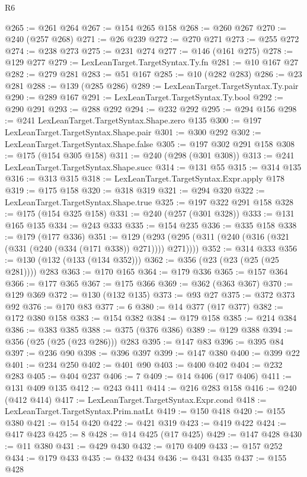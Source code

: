 \begin{lexlean}{R6}
\begin{coremodule}
{{{{{{{{{{{{{{{{{{{{{{{{{{{{{{{{{{{{{{{{{{{{{{{{{{{{{{{{{{{{{{{{{{{{{{{{@265 := @261 @264
@267 := @154 @265 @158
@268 := @260 @267
@270 := @240 (@257 @268)
@271 := @26 @239
@272 := @270 @271
@273 := @255 @272
@274 := @238 @273
@275 := @231 @274
@277 := @146 (@161 @275)
@278 := @129 @277
@279 := LexLeanTarget.TargetSyntax.Ty.fn
@281 := @10 @167 @27
@282 := @279 @281
@283 := @51 @167
@285 := @10 (@282 @283)
@286 := @23 @281
@288 := @139 (@285 @286)
@289 := LexLeanTarget.TargetSyntax.Ty.pair
@290 := @289 @167
@291 := LexLeanTarget.TargetSyntax.Ty.bool
@292 := @290 @291
@293 := @288 @292
@294 := @232 @292
@295 := @294 @156
@298 := @241 LexLeanTarget.TargetSyntax.Shape.zero @135
@300 := @197 LexLeanTarget.TargetSyntax.Shape.pair
@301 := @300 @292
@302 := LexLeanTarget.TargetSyntax.Shape.false
@305 := @197 @302 @291 @158
@308 := @175 (@154 @305 @158)
@311 := @240 (@298 (@301 @308))
@313 := @241 LexLeanTarget.TargetSyntax.Shape.succ
@314 := @131 @55
@315 := @314 @135
@316 := @313 @315
@318 := LexLeanTarget.TargetSyntax.Expr.apply @178
@319 := @175 @158
@320 := @318 @319
@321 := @294 @320
@322 := LexLeanTarget.TargetSyntax.Shape.true
@325 := @197 @322 @291 @158
@328 := @175 (@154 @325 @158)
@331 := @240 (@257 (@301 @328))
@333 := @131 @165 @135
@334 := @243 @333
@335 := @154 @235
@336 := @335 @158
@338 := @179 (@177 @336)
@351 := @129 (@293 (@295 (@311 (@240 (@316 (@321 (@331 (@240 (@334 (@171 @338)) @271)))) @271))))
@352 := @314 @333
@356 := @130 (@132 (@133 (@134 @352)))
@362 := @356 (@23 (@23 (@25 (@25 @281)))) @283
@363 := @170 @165
@364 := @179 @336
@365 := @157 @364
@366 := @177 @365
@367 := @175 @366
@369 := @362 (@363 @367)
@370 := @129 @369
@372 := @130 (@132 @135)
@373 := @93 @27
@375 := @372 @373 @92
@376 := @170 @83
@377 := 6
@380 := @14 @377 (@17 @377)
@382 := @172 @380 @158
@383 := @154 @382
@384 := @179 @158
@385 := @214 @384
@386 := @383 @385
@388 := @375 (@376 @386)
@389 := @129 @388
@394 := @356 (@25 (@25 (@23 @286))) @283
@395 := @147 @83
@396 := @395 @84
@397 := @236 @90
@398 := @396 @397
@399 := @147 @380
@400 := @399 @22
@401 := @234 @250
@402 := @401 @90
@403 := @400 @402
@404 := @232 @283
@405 := @404 @237
@406 := 7
@409 := @14 @406 (@17 @406)
@411 := @131 @409 @135
@412 := @243 @411
@414 := @216 @283 @158
@416 := @240 (@412 @414)
@417 := LexLeanTarget.TargetSyntax.Expr.cond
@418 := LexLeanTarget.TargetSyntax.Prim.natLt
@419 := @150 @418
@420 := @155 @380
@421 := @154 @420
@422 := @421 @319
@423 := @419 @422
@424 := @417 @423
@425 := 8
@428 := @14 @425 (@17 @425)
@429 := @147 @428
@430 := @11 @380
@431 := @429 @430
@432 := @170 @409
@433 := @157 @252
@434 := @179 @433
@435 := @432 @434
@436 := @431 @435
@437 := @155 @428
}}}}}}}}}}}}}}}}}}}}}}}}}}}}}}}}}}}}}}}}}}}}}}}}}}}}}}}}}}}}}}}}}}}}}}}}
\end{coremodule}
\end{lexlean}
